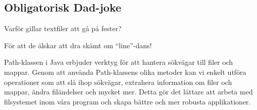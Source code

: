 \hypertarget{obligatorisk-dad-joke}{%
\subsection{Obligatorisk Dad-joke}\label{obligatorisk-dad-joke}}

Varför gillar textfiler att gå på fester?

För att de älskar att dra skämt om ``line''-dans!

Path-klassen i Java erbjuder verktyg för att hantera sökvägar till filer
och mappar. Genom att använda Path-klassens olika metoder kan vi enkelt
utföra operationer som att slå ihop sökvägar, extrahera information om
filer och mappar, ändra filändelser och mycket mer. Detta gör det
lättare att arbeta med filsystemet inom våra program och skapa bättre
och mer robusta applikationer.

